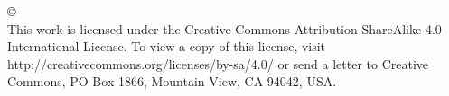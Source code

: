 
\thispagestyle{empty} %
\null\vfill %
\begin{center}
  \SingleSpace %
© \@date~\@author\\
This work is licensed under the Creative Commons Attribution-ShareAlike 4.0 International License. To view a copy of this license, visit {http://creativecommons.org/licenses/by-sa/4.0/} or send a letter to Creative Commons, PO Box 1866, Mountain View, CA 94042, USA.
\end{center}
